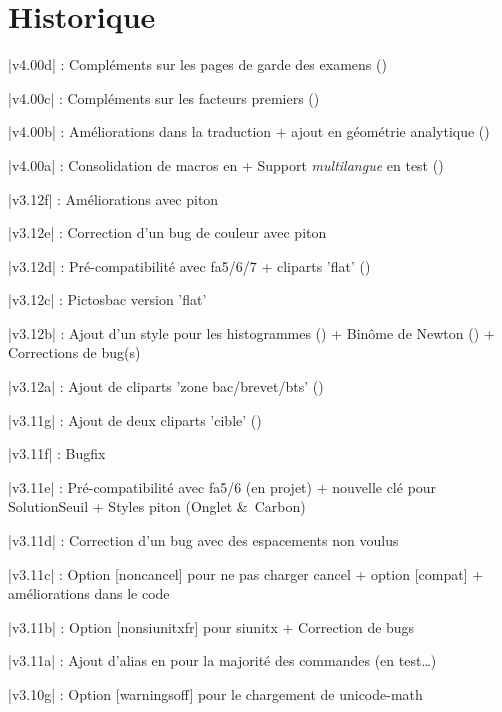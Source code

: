 \part{Historique}

{\small \bverb|v4.00d| : Compléments sur les pages de garde des examens (\pageref{pagegardebac})}

{\small \bverb|v4.00c| : Compléments sur les facteurs premiers (\pageref{facteurspremiers})}

{\small \bverb|v4.00b| : Améliorations dans la traduction + ajout en géométrie analytique (\pageref{eqsphere})}

{\small \bverb|v4.00a| : Consolidation de macros en  + Support \textit{multilangue} en test (\pageref{multilng})}

{\small \bverb|v3.12f| : Améliorations avec \textsf{piton}}

{\small \bverb|v3.12e| : Correction d'un bug de couleur avec \textsf{piton}}

{\small \bverb|v3.12d| : Pré-compatibilité avec fa5/6/7 + cliparts 'flat' (\pageref{clipartsflat})}

{\small \bverb|v3.12c| : Pictosbac version 'flat'}

{\small \bverb|v3.12b| : Ajout d'un style pour les histogrammes (\pageref{histo}) + Binôme de Newton (\pageref{binomnewton}) + Corrections de bug(s)}

{\small \bverb|v3.12a| : Ajout de cliparts 'zone bac/brevet/bts' (\pageref{clipartsbac})}

{\small \bverb|v3.11g| : Ajout de deux cliparts 'cible' (\pageref{cliparts})}

{\small \bverb|v3.11f| : Bugfix}

{\small \bverb|v3.11e| : Pré-compatibilité avec fa5/6 (en projet) + nouvelle clé pour \textsf{SolutionSeuil} + Styles \textsf{piton} (Onglet \&\ Carbon)}

{\small \bverb|v3.11d| : Correction d'un bug avec des espacements non voulus}

{\small \bverb|v3.11c| : Option \textsf{[noncancel]} pour ne pas charger \textsf{cancel} + option \textsf{[compat]} + améliorations dans le code}

{\small \bverb|v3.11b| : Option \textsf{[nonsiunitxfr]} pour \textsf{siunitx} + Correction de bugs}

{\small \bverb|v3.11a| : Ajout d'alias en  pour la majorité des commandes (en test\ldots)}

{\small \bverb|v3.10g| : Option \textsf{[warningsoff]} pour le chargement de \textsf{unicode-math}}

